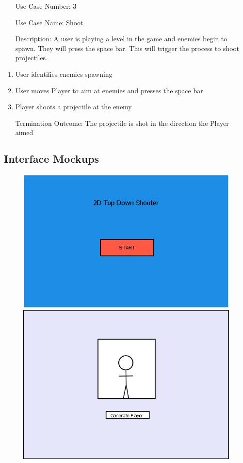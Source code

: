 \documentclass[10pt,conference,onecolumn,compsoc]{IEEEtran}
\begin{document}
\begin{itemize}
\item[Use Case Number:]3
\item[Use Case Name:] Shoot
\item[Description:] A user is playing a level in the game and enemies begin to spawn. They will press the space bar. This will trigger the process to shoot projectiles.
\end{itemize}
\begin{enumerate}
\item User identifies enemies spawning
\item User moves Player to aim at enemies and presses the space bar
\item Player shoots a projectile at the enemy
\item[Termination Outcome:] The projectile is shot in the direction the Player aimed
\end{enumerate}




\subsection{Interface Mockups}
\begin{figure}[ht!]
\includegraphics[scale=.25]{Start.png}
\includegraphics[scale=.25]{Player.png}
\caption{}
\label{UML}
\end{figure}
\end{document}
